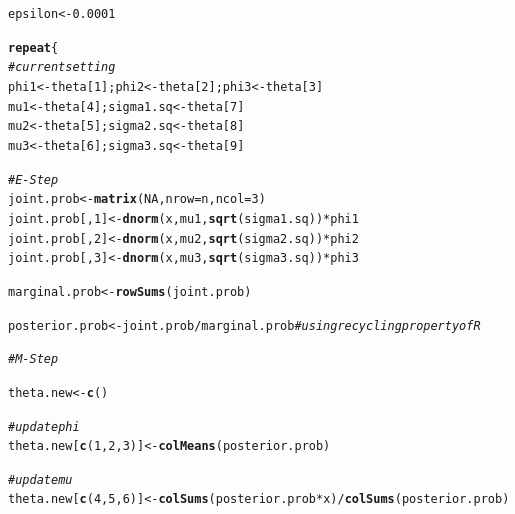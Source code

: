 \documentclass[11pt, a4paper]{article}\usepackage[]{graphicx}\usepackage[]{xcolor}
\makeatletter
\newcommand{\hlnum}[1]{\textcolor[rgb]{0.686,0.059,0.569}{#1}}%
\newcommand{\hlcom}[1]{\textcolor[rgb]{0.678,0.584,0.686}{\textit{#1}}}%
\newcommand{\hlopt}[1]{\textcolor[rgb]{0,0,0}{#1}}%
\newcommand{\hldef}[1]{\textcolor[rgb]{0.345,0.345,0.345}{#1}}%
\newcommand{\hlkwa}[1]{\textcolor[rgb]{0.161,0.373,0.58}{\textbf{#1}}}%
\newcommand{\hlkwb}[1]{\textcolor[rgb]{0.69,0.353,0.396}{#1}}%
\newcommand{\hlkwc}[1]{\textcolor[rgb]{0.333,0.667,0.333}{#1}}%
\newcommand{\hlkwd}[1]{\textcolor[rgb]{0.737,0.353,0.396}{\textbf{#1}}}%
\newenvironment{kframe}{%
 \def\at@end@of@kframe{}%
 \ifinner\ifhmode%
  \def\at@end@of@kframe{\end{minipage}}%
  \begin{minipage}{\columnwidth}%
 \fi\fi%
 \def\FrameCommand##1{\hskip\@totalleftmargin \hskip-\fboxsep
 \colorbox{shadecolor}{##1}\hskip-\fboxsep
     \hskip-\linewidth \hskip-\@totalleftmargin \hskip\columnwidth}%
 \MakeFramed {\advance\hsize-\width
   \@totalleftmargin\z@ \linewidth\hsize
   \@setminipage}}%
 {\par\unskip\endMakeFramed%
 \at@end@of@kframe}
\newenvironment{knitrout}{}{} %
\makeatother
\begin{document}
\begin{enumerate}
\begin{knitrout}
\color{fgcolor}\begin{kframe}
\begin{alltt}
\hldef{epsilon} \hlkwb{<-} \hlnum{0.0001}
\end{alltt}
\end{kframe}
\end{knitrout}

\begin{knitrout}
\color{fgcolor}\begin{kframe}
\begin{alltt}
\hlkwa{repeat}\hldef{\{}
  \hlcom{# current setting}
  \hldef{phi1} \hlkwb{<-} \hldef{theta[}\hlnum{1}\hldef{]; phi2} \hlkwb{<-} \hldef{theta[}\hlnum{2}\hldef{]; phi3} \hlkwb{<-} \hldef{theta[}\hlnum{3}\hldef{]}
  \hldef{mu1} \hlkwb{<-} \hldef{theta[}\hlnum{4}\hldef{]; sigma1.sq} \hlkwb{<-} \hldef{theta[}\hlnum{7}\hldef{]}
  \hldef{mu2} \hlkwb{<-} \hldef{theta[}\hlnum{5}\hldef{]; sigma2.sq} \hlkwb{<-} \hldef{theta[}\hlnum{8}\hldef{]}
  \hldef{mu3} \hlkwb{<-} \hldef{theta[}\hlnum{6}\hldef{]; sigma3.sq} \hlkwb{<-} \hldef{theta[}\hlnum{9}\hldef{]}

  \hlcom{# E-Step}
  \hldef{joint.prob} \hlkwb{<-} \hlkwd{matrix}\hldef{(}\hlnum{NA}\hldef{,} \hlkwc{nrow} \hldef{= n,} \hlkwc{ncol} \hldef{=} \hlnum{3}\hldef{)}
  \hldef{joint.prob[,}\hlnum{1}\hldef{]} \hlkwb{<-} \hlkwd{dnorm}\hldef{(x, mu1,} \hlkwd{sqrt}\hldef{(sigma1.sq))} \hlopt{*} \hldef{phi1}
  \hldef{joint.prob[,}\hlnum{2}\hldef{]} \hlkwb{<-} \hlkwd{dnorm}\hldef{(x, mu2,} \hlkwd{sqrt}\hldef{(sigma2.sq))} \hlopt{*} \hldef{phi2}
  \hldef{joint.prob[,}\hlnum{3}\hldef{]} \hlkwb{<-} \hlkwd{dnorm}\hldef{(x, mu3,} \hlkwd{sqrt}\hldef{(sigma3.sq))} \hlopt{*} \hldef{phi3}

  \hldef{marginal.prob} \hlkwb{<-} \hlkwd{rowSums}\hldef{(joint.prob)}

  \hldef{posterior.prob} \hlkwb{<-} \hldef{joint.prob} \hlopt{/} \hldef{marginal.prob} \hlcom{# using recycling property of R}

  \hlcom{# M-Step}

  \hldef{theta.new} \hlkwb{<-} \hlkwd{c}\hldef{()}

  \hlcom{# update phi}
  \hldef{theta.new[}\hlkwd{c}\hldef{(}\hlnum{1}\hldef{,} \hlnum{2}\hldef{,} \hlnum{3}\hldef{)]} \hlkwb{<-} \hlkwd{colMeans}\hldef{(posterior.prob)}

  \hlcom{# update mu}
  \hldef{theta.new[}\hlkwd{c}\hldef{(}\hlnum{4}\hldef{,} \hlnum{5}\hldef{,} \hlnum{6}\hldef{)]} \hlkwb{<-} \hlkwd{colSums}\hldef{(posterior.prob} \hlopt{*} \hldef{x)} \hlopt{/} \hlkwd{colSums}\hldef{(posterior.prob)}


\end{alltt}
\end{kframe}
\end{knitrout}
\end{enumerate}
\end{document}
